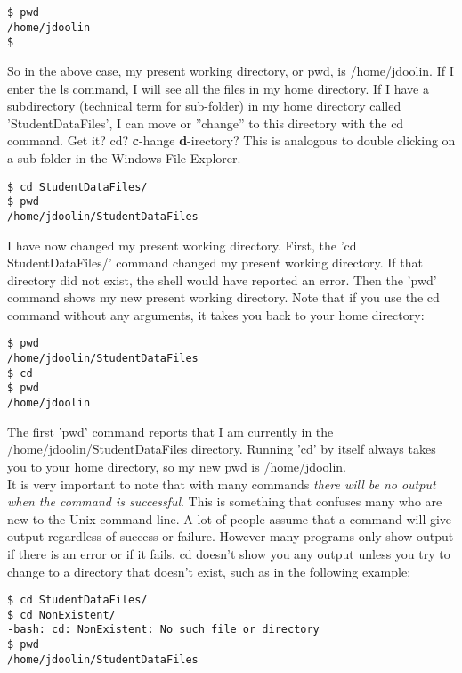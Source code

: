 \begin{verbatim}
$ pwd
/home/jdoolin
$
\end{verbatim}

So in the above case, my present working directory, or pwd, is /home/jdoolin.  If I enter the ls command, I will see all the files in my home directory.  If I have a subdirectory (technical term for sub-folder) in my home directory called 'StudentDataFiles', I can move or ''change'' to this directory with the cd command.  Get it?  cd?  \textbf{c}-hange \textbf{d}-irectory?  This is analogous to double clicking on a sub-folder in the Windows File Explorer.

\begin{verbatim}
$ cd StudentDataFiles/
$ pwd
/home/jdoolin/StudentDataFiles
\end{verbatim}

I have now changed my present working directory.  First, the 'cd StudentDataFiles/' command changed my present working directory.  If that directory did not exist, the shell would have reported an error.  Then the 'pwd' command shows my new present working directory.  Note that if you use the cd command without any arguments, it takes you back to your home directory:

\begin{verbatim}
$ pwd
/home/jdoolin/StudentDataFiles
$ cd
$ pwd
/home/jdoolin
\end{verbatim}

The first 'pwd' command reports that I am currently in the /home/jdoolin/StudentDataFiles directory.  Running 'cd' by itself always takes you to your home directory, so my new pwd is /home/jdoolin.\\

It is very important to note that with many commands \textit{there will be no output when the command is successful}.  This is something that confuses many who are new to the Unix command line.  A lot of people assume that a command will give output regardless of success or failure.  However many programs only show output if there is an error or if it fails.  cd doesn't show you any output unless you try to change to a directory that doesn't exist, such as in the following example:

\begin{verbatim}
$ cd StudentDataFiles/
$ cd NonExistent/
-bash: cd: NonExistent: No such file or directory
$ pwd
/home/jdoolin/StudentDataFiles
\end{verbatim}

